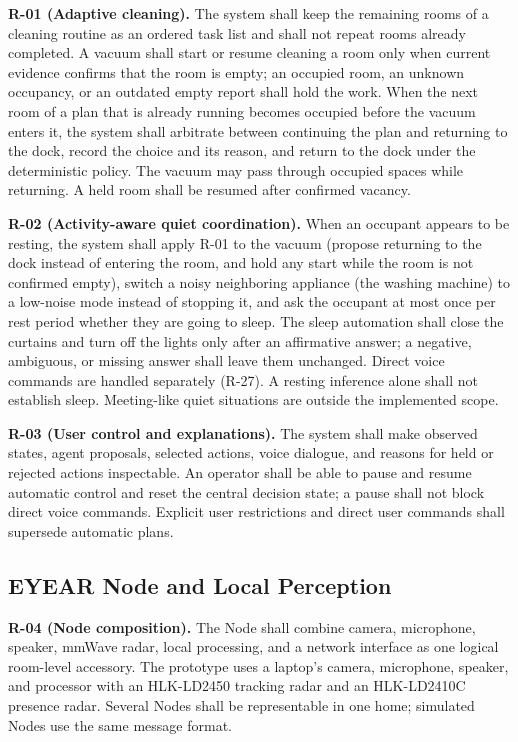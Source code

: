 \documentclass[conference]{IEEEtran}
\begin{document}
\textbf{R-01 (Adaptive cleaning).}
The system shall keep the remaining rooms of a cleaning routine
as an ordered task list and shall not repeat rooms already
completed. A vacuum shall start or resume cleaning a room only when
current evidence confirms that the room is empty; an occupied room,
an unknown occupancy, or an outdated empty report shall hold the
work. When the next room of a plan that is already running becomes
occupied before the vacuum enters it, the system shall arbitrate
between continuing the plan and returning to the dock, record the
choice and its reason, and return to the dock under the
deterministic policy. The vacuum may pass through occupied spaces
while returning. A held room shall be resumed after confirmed
vacancy.

\textbf{R-02 (Activity-aware quiet coordination).}
When an occupant appears to be resting, the system shall apply
R-01 to the vacuum (propose returning to the dock instead of
entering the room, and hold any start while the room is not
confirmed empty), switch a noisy neighboring appliance (the washing
machine) to a low-noise mode instead of stopping it, and ask the
occupant at most once per rest period whether they are going to
sleep. The sleep automation shall close the curtains and turn off
the lights only after an affirmative answer; a negative, ambiguous,
or missing answer shall leave them unchanged. Direct voice commands
are handled separately (R-27). A resting inference alone shall
not establish sleep. Meeting-like quiet situations are outside the
implemented scope.

\textbf{R-03 (User control and explanations).}
The system shall make observed states, agent proposals, selected
actions, voice dialogue, and reasons for held or rejected actions
inspectable. An operator shall be able to pause and resume
automatic control and reset the central decision state; a pause
shall not block direct voice commands. Explicit user restrictions
and direct user commands shall supersede automatic plans.

\subsection{EYEAR Node and Local Perception}

\textbf{R-04 (Node composition).}
The Node shall combine camera, microphone, speaker, mmWave radar,
local processing, and a network interface as one logical room-level
accessory. The prototype uses a laptop's camera, microphone,
speaker, and processor with an HLK-LD2450 tracking radar and an
HLK-LD2410C presence radar. Several Nodes shall be representable in
one home; simulated Nodes use the same message format.
\end{document}

